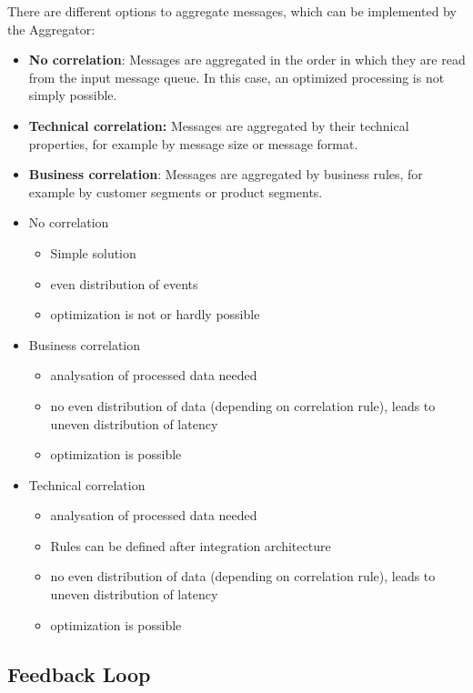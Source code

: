 There are different options to aggregate messages, which can be implemented by the Aggregator:

\begin{itemize}
	\item \textbf{No correlation}: Messages are aggregated in the order in which they are read from the input message queue. In this case, an optimized processing is not simply possible.
	\item \textbf{Technical correlation:} Messages are aggregated by their technical properties, for example by message size or message format.
	\item \textbf{Business correlation}: Messages are aggregated by business rules, for example by customer segments or product segments.
\end{itemize}

	\begin{itemize}
		\item No correlation
		\begin{itemize}
			\item Simple solution
			\item even distribution of events
			\item optimization is not or hardly possible
		\end{itemize}
		\item Business correlation
		\begin{itemize}
			\item analysation of processed data needed
			\item no even distribution of data (depending on correlation rule), leads to uneven distribution of latency
			\item optimization is possible
		\end{itemize}
		\item Technical correlation
		\begin{itemize}
			\item analysation of processed data needed
			\item Rules can be defined after integration architecture
			\item no even distribution of data (depending on correlation rule), leads to uneven distribution of latency
			\item optimization is possible
		\end{itemize}
	\end{itemize}

\subsection{Feedback Loop}

